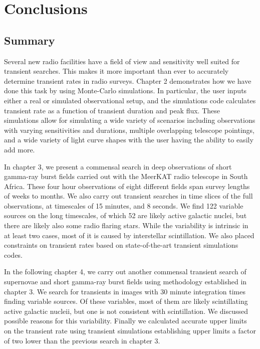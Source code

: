 \documentclass[12pt]{article}
\begin{document}
\newpage
\section{Conclusions}
\label{conc}
\subsection{Summary}
Several new radio facilities have a field of view and sensitivity well suited for transient searches. This makes it more important than ever to accurately determine transient rates in radio surveys. Chapter 2 demonstrates how we have done this task by using Monte-Carlo simulations. In particular, the user inputs either a real or simulated observational setup, and the simulations code calculates transient rate as a function of transient duration and peak flux. These simulations allow for simulating a wide variety of scenarios including observations with varying sensitivities and durations, multiple overlapping telescope pointings, and a wide variety of light curve shapes with the user having the ability to easily add more. 

In chapter 3, we present a commensal search in deep observations of short gamma-ray burst fields carried out with the MeerKAT radio telescope in South Africa. These four hour observations of eight different fields span survey lengths of weeks to months. We also carry out transient searches in time slices of the full observations, at timescales of 15 minutes, and 8 seconds. We find 122 variable sources on the long timescales, of which 52 are likely active galactic nuclei, but there are likely also some radio flaring stars. While the variability is intrinsic in at least two cases, most of it is caused by interstellar scintillation. We also placed constraints on transient rates based on state-of-the-art transient simulations codes.

In the following chapter 4, we carry out another commensal transient search of supernovae and short gamma-ray burst fields using methodology established in chapter 3. We search for transients in images with 30 minute integration times finding variable sources. Of these variables, most of them are likely scintillating active galactic nucleii, but one is not consistent with scintillation. We discussed possible reasons for this variability. Finally we calculated accurate upper limits on the transient rate using transient simulations establishing upper limits a factor of two lower than the previous search in chapter 3. 
\end{document}

